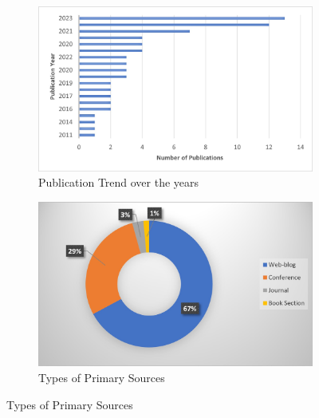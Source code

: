 \begin{figure}
  \begin{subfigure}[b]{0.5\textwidth}
	\centering
	\includegraphics[width=\textwidth]{PublicationTrend.jpg}
	\caption{Publication Trend over the years}
	\Description{}
	\label{fig:Trend}
  \end{subfigure}

  \begin{subfigure}[b]{0.5\textwidth}
	\centering
	\includegraphics[width=\textwidth]{TypeSources.jpg}
	\caption{Types of Primary Sources}
	\Description{}
	\label{fig:Sources}
  \end{subfigure}
  
\end{figure}


